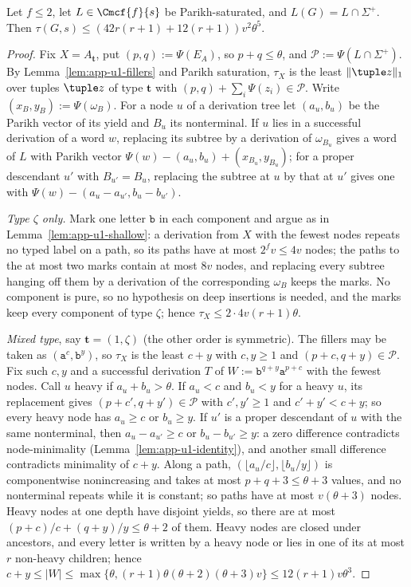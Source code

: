 \begin{lemma}\label{lem:app-u1-parikh}
Let $f\le2$, let $L\in\Cmcf{f}{s}$ be Parikh-saturated, and
$L(G)=L\cap\Sigma^+$.  Then $\tau(G,s)\le(42r(r+1)+12(r+1))v^2\theta^5$.
\end{lemma}

\begin{proof}
Fix $X=A_{\mathbf t}$, put $(p,q):=\Psi(E_A)$, so $p+q\le\theta$, and
$\mathcal P:=\Psi(L\cap\Sigma^+)$.  By Lemma~\ref{lem:app-u1-fillers} and Parikh
saturation, $\tau_X$ is the least $\|\tuple z\|_1$ over tuples $\tuple z$ of type
$\mathbf t$ with $(p,q)+\sum_i\Psi(z_i)\in\mathcal P$.  Write $(x_B,y_B):=\Psi(\omega_B)$.
For a node $u$ of a derivation tree let $(a_u,b_u)$ be the Parikh vector of its
yield and $B_u$ its nonterminal.  If $u$ lies in a successful derivation of a word
$w$, replacing its subtree by a derivation of $\omega_{B_u}$ gives a word of $L$
with Parikh vector $\Psi(w)-(a_u,b_u)+(x_{B_u},y_{B_u})$; for a proper descendant
$u'$ with $B_{u'}=B_u$, replacing the subtree at $u$ by that at $u'$ gives one
with $\Psi(w)-(a_u-a_{u'},b_u-b_{u'})$.

\emph{Type $\zeta$ only.}  Mark one letter $\mathtt b$ in each component and argue as
in Lemma~\ref{lem:app-u1-shallow}: a derivation from $X$ with the fewest nodes repeats
no typed label on a path, so its paths have at most $2^fv\le4v$ nodes; the paths to
the at most two marks contain at most $8v$ nodes, and replacing every subtree hanging
off them by a derivation of the corresponding $\omega_B$ keeps the marks.  No
component is pure, so no hypothesis on deep insertions is needed, and the marks keep
every component of type $\zeta$; hence $\tau_X\le2\cdot4v(r+1)\theta$.

\emph{Mixed type}, say $\mathbf t=(1,\zeta)$ (the other order is symmetric).  The
fillers may be taken as $(\mathtt a^c,\mathtt b^y)$, so $\tau_X$ is the least $c+y$
with $c,y\ge1$ and $(p+c,q+y)\in\mathcal P$.  Fix such $c,y$ and a successful
derivation $T$ of $W:=\mathtt b^{q+y}\mathtt a^{p+c}$ with the fewest nodes.  Call $u$
heavy if $a_u+b_u>\theta$.  If $a_u<c$ and $b_u<y$ for a heavy $u$, its replacement
gives $(p+c',q+y')\in\mathcal P$ with $c',y'\ge1$ and $c'+y'<c+y$; so every heavy
node has $a_u\ge c$ or $b_u\ge y$.  If $u'$ is a proper descendant of $u$ with the
same nonterminal, then $a_u-a_{u'}\ge c$ or $b_u-b_{u'}\ge y$: a zero difference
contradicts node-minimality (Lemma~\ref{lem:app-u1-identity}), and another small
difference contradicts minimality of $c+y$.  Along a path, $(\lfloor a_u/c\rfloor,
\lfloor b_u/y\rfloor)$ is componentwise nonincreasing and takes at most $p+q+3\le
\theta+3$ values, and no nonterminal repeats while it is constant; so paths have
at most $v(\theta+3)$ nodes.  Heavy nodes at one depth have disjoint yields, so
there are at most $(p+c)/c+(q+y)/y\le\theta+2$ of them.  Heavy nodes are closed
under ancestors, and every letter is written by a heavy node or lies in one of its
at most $r$ non-heavy children; hence
$c+y\le|W|\le\max\{\theta,(r+1)\theta(\theta+2)(\theta+3)v\}\le12(r+1)v\theta^3$.


\end{proof}

